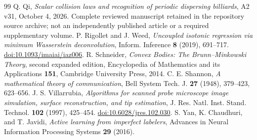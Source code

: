 \begin{thebibliography}{99}
Q. Qi, \emph{Scalar collision laws and recognition of periodic dispersing
billiards}, A2 v31, October 4, 2026. Complete reviewed manuscript retained in the repository source archive;
not an independently published article or a required supplementary volume.
P. Rigollet and J. Weed, \emph{Uncoupled isotonic regression via minimum
Wasserstein deconvolution}, Inform. Inference \textbf{8} (2019), 691--717.
\href{https://doi.org/10.1093/imaiai/iaz006}{doi:10.1093/imaiai/iaz006}.
R. Schneider, \emph{Convex Bodies: The Brunn--Minkowski Theory},
second expanded edition, Encyclopedia of Mathematics and its Applications
\textbf{151}, Cambridge University Press, 2014.
C. E. Shannon, \emph{A mathematical theory of communication},
Bell System Tech. J. \textbf{27} (1948), 379--423, 623--656.
J. S. Villarrubia, \emph{Algorithms for scanned probe microscope image
simulation, surface reconstruction, and tip estimation},
J. Res. Natl. Inst. Stand. Technol. \textbf{102} (1997), 425--454.
\href{https://doi.org/10.6028/jres.102.030}{doi:10.6028/jres.102.030}.
S. Yan, K. Chaudhuri, and T. Javidi,
\emph{Active learning from imperfect labelers},
Advances in Neural Information Processing Systems \textbf{29} (2016).
\end{thebibliography}
